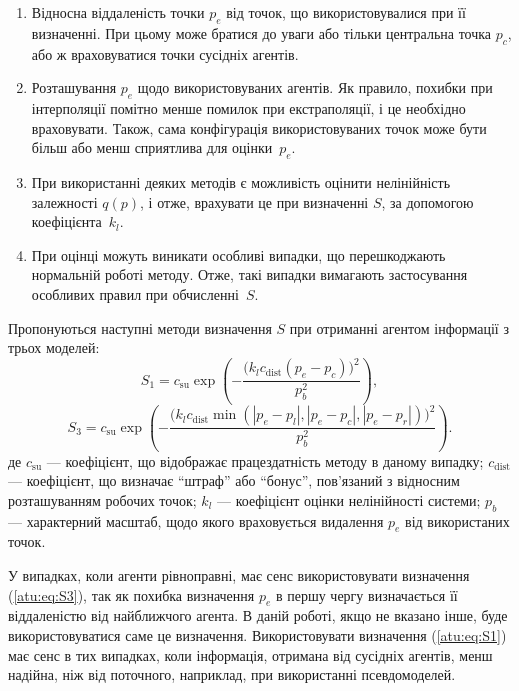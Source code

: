 \begin{enumerate}

  \item
    Відносна віддаленість точки
    $p_e$ від точок, що використовувалися при її визначенні. При
    цьому може братися до уваги або тільки центральна точка
    $p_c$, або ж враховуватися точки сусідніх агентів.

  \item
    Розташування
    $p_e$ щодо використовуваних агентів. Як правило, похибки при
    інтерполяції помітно менше помилок при екстраполяції,
    і це необхідно враховувати. Також, сама конфігурація
    використовуваних точок може бути більш або менш сприятлива для
    оцінки~$p_e$.

  \item
    При використанні деяких методів є можливість оцінити
    нелінійність залежності
    $q(p)$, і отже, врахувати це при визначенні
    $S$, за допомогою коефіцієнта~$k_l$.

  \item
    При оцінці можуть виникати особливі випадки, що перешкоджають
    нормальній роботі методу. Отже, такі випадки вимагають
    застосування особливих правил при обчисленні~$S$.

\end{enumerate}

Пропонуються наступні
методи визначення $S$ при отриманні агентом інформації з трьох моделей:
%
\begin{equation}
  S_1 = c_\mathrm{su} \exp \left( - \frac{ \big( k_l c_\mathrm{dist}( p_e - p_c ) \big)^2 }{p_b^2} \right)
  ,
  \label{atu:eq:S1}
\end{equation}
%
\begin{equation}
  S_3 = c_\mathrm{su} \exp \left( - \frac{ \big( k_l c_\mathrm{dist} \min( |p_e - p_l|,|p_e - p_c|, |p_e - p_r| ) \big)^2 }{p_b^2} \right)
  .
  \label{atu:eq:S3}
\end{equation}
%
де
$c_\mathrm{su}$ ---
коефіцієнт, що відображає працездатність методу в даному випадку;
$c_\mathrm{dist}$ ---
коефіцієнт, що визначає ``штраф'' або ``бонус'', пов'язаний з відносним розташуванням робочих точок;
$k_l$ ---
коефіцієнт оцінки нелінійності системи;
$p_b$ ---
характерний масштаб, щодо якого враховується видалення $p_e$ від використаних точок.


У випадках, коли агенти рівноправні, має сенс використовувати визначення
(\ref{atu:eq:S3}), так як похибка визначення $p_e$ в першу чергу визначається її
віддаленістю від найближчого агента. В даній роботі, якщо не вказано інше, буде
використовуватися саме це визначення.
Використовувати визначення (\ref{atu:eq:S1}) має сенс в тих випадках,
коли інформація, отримана від сусідніх агентів, менш надійна,
ніж від поточного, наприклад, при використанні псевдомоделей.

